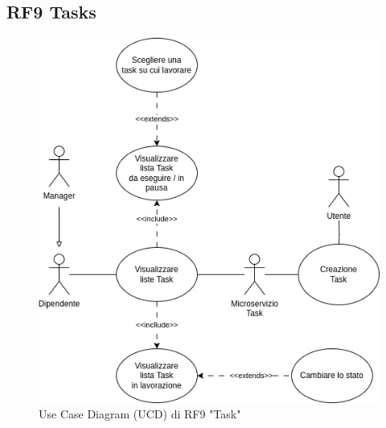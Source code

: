 \documentclass{report}
\begin{document}
\subsection*{RF9 Tasks}

\begin{figure}[H]
	\centering\includegraphics[width=1\textwidth]{images/UCD/RF9_task_UCD.png}
	Use Case Diagram (UCD) di RF9 "Task"
\end{figure}
\end{document}
